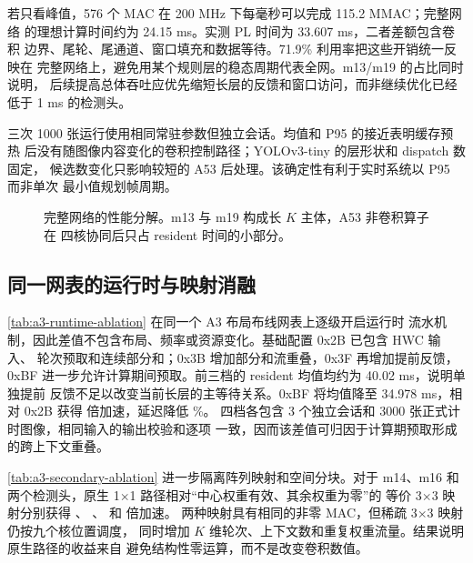 若只看峰值，576 个 MAC 在 200 MHz 下每毫秒可以完成 115.2 MMAC；完整网络
的理想计算时间约为 24.15 ms。实测 PL 时间为 33.607 ms，二者差额包含卷积
边界、尾轮、尾通道、窗口填充和数据等待。71.9\% 利用率把这些开销统一反映在
完整网络上，避免用某个规则层的稳态周期代表全网。m13/m19 的占比同时说明，
后续提高总体吞吐应优先缩短长层的反馈和窗口访问，而非继续优化已经低于
1 ms 的检测头。

三次 1000 张运行使用相同常驻参数但独立会话。均值和 P95 的接近表明缓存预热
后没有随图像内容变化的卷积控制路径；YOLOv3-tiny 的层形状和 dispatch 数固定，
候选数变化只影响较短的 A53 后处理。该确定性有利于实时系统以 P95 而非单次
最小值规划帧周期。

\begin{figure}[t]
\centering
{}
\caption{完整网络的性能分解。m13 与 m19 构成长 $K$ 主体，A53 非卷积算子在
四核协同后只占 resident 时间的小部分。}
\label{fig:performance-placeholder}
\end{figure}

\subsection{同一网表的运行时与映射消融}



\cref{tab:a3-runtime-ablation} 在同一个 A3 布局布线网表上逐级开启运行时
流水机制，因此差值不包含布局、频率或资源变化。基础配置 0x2B 已包含 HWC 输入、
轮次预取和连续部分和；0x3B 增加部分和流重叠，0x3F 再增加提前反馈，0xBF
进一步允许计算期间预取。前三档的 resident 均值均约为 40.02 ms，说明单独提前
反馈不足以改变当前长层的主等待关系。0xBF 将均值降至 34.978 ms，相对 0x2B
获得 \AblRuntimeFullSpeedup{} 倍加速，延迟降低 \AblRuntimeReductionPct{}\%。
四档各包含 3 个独立会话和 3000 张正式计时图像，相同输入的输出校验和逐项
一致，因而该差值可归因于计算期预取形成的跨上下文重叠。

\cref{tab:a3-secondary-ablation} 进一步隔离阵列映射和空间分块。对于 m14、m16
和两个检测头，原生 1$\times$1 路径相对“中心权重有效、其余权重为零”的
等价 3$\times$3 映射分别获得 \AblMFourteenSpeedup{}、
\AblMSixteenSpeedup{}、\AblPFourSpeedup{} 和 \AblPFiveSpeedup{} 倍加速。
两种映射具有相同的非零 MAC，但稀疏 3$\times$3 映射仍按九个核位置调度，
同时增加 $K$ 维轮次、上下文数和重复权重流量。结果说明原生路径的收益来自
避免结构性零运算，而不是改变卷积数值。

